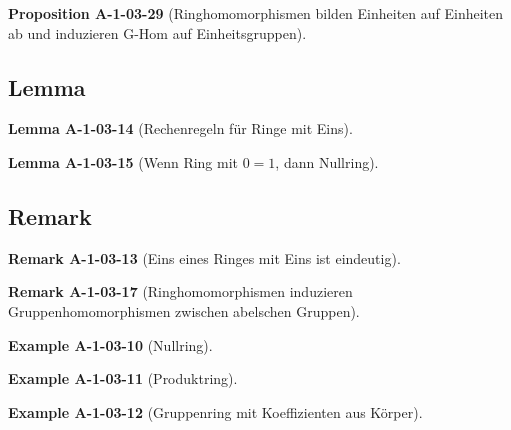 \documentclass[10pt, letterpaper]{article}
\newcommand{\CustomHeading}[3]{%
  \par\medskip\noindent%
  \textbf{#1 #2} \textnormal{(#3)}.\enskip%
}
\newenvironment{PROP}[2]{\CustomHeading{Proposition}{#1}{#2}}{}
\newenvironment{LEM}[2]{\CustomHeading{Lemma}{#1}{#2}}{}
\newenvironment{REM}[2]{\CustomHeading{Remark}{#1}{#2}}{}
\newenvironment{EXA}[2]{\CustomHeading{Example}{#1}{#2}}{}
\begin{document}
\begin{PROP}{A-1-03-29}{Ringhomomorphismen bilden Einheiten auf Einheiten ab und induzieren G-Hom auf Einheitsgruppen}

\end{PROP}



\subsection{Lemma}



\begin{LEM}{A-1-03-14}{Rechenregeln für Ringe mit Eins}

\end{LEM}

\begin{LEM}{A-1-03-15}{Wenn Ring mit $0=1$, dann Nullring}

\end{LEM}



\subsection{Remark}



\begin{REM}{A-1-03-13}{Eins eines Ringes mit Eins ist eindeutig}

\end{REM}

\begin{REM}{A-1-03-17}{Ringhomomorphismen induzieren Gruppenhomomorphismen zwischen abelschen Gruppen}

\end{REM}







\begin{EXA}{A-1-03-10}{Nullring}

\end{EXA}

\begin{EXA}{A-1-03-11}{Produktring}

\end{EXA}

\begin{EXA}{A-1-03-12}{Gruppenring mit Koeffizienten aus Körper}

\end{EXA}
\end{document}
